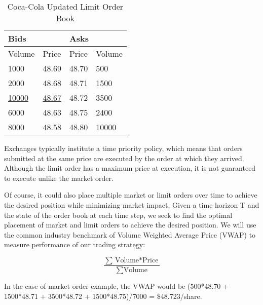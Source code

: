 \begin{table}[htbp]
\caption{Coca-Cola Updated Limit Order Book} \label{tab:coke2}
\begin{center}
\begin{tabular}{ll|ll}
\hline \hline
\multicolumn{2}{l|}{\textbf{Bids}} & \multicolumn{2}{l}{\textbf{Asks}} \\
\hline
Volume           & Price          & Price           & Volume          \\
\hline
1000             & 48.69          & 48.70           & 500             \\
2000             & 48.68          & 48.71           & 1500            \\
\underline{10000}             & \underline{48.67}          & 48.72           & 3500            \\
6000             & 48.63          & 48.75           & 2400            \\
8000             & 48.58          & 48.80           & 10000          
\end{tabular}
\end{center}
\end{table}

Exchanges typically institute a time priority policy, which means that orders submitted at the same price are executed by the order at which they arrived. Although the limit order has a maximum price at execution, it is not guaranteed to execute unlike the market order. 

Of course, it could also place multiple market or limit orders over time to achieve the desired position while minimizing market impact. Given a time horizon T and the state of the order book at each time step, we seek to find the optimal placement of market and limit orders to achieve the desired position. We will use the common industry benchmark of Volume Weighted Average Price (VWAP) to measure performance of our trading strategy:

$$ \frac{\sum{\text{Volume} * \text{Price}}}{\sum{\text{Volume}}}$$

In the case of market order example, the VWAP would be (500*48.70 + 1500*48.71 + 3500*48.72 + 1500*48.75)/7000 = \$48.723/share.


